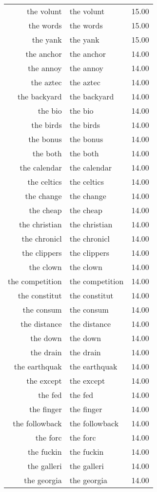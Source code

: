 \begin{table}[ht]
\begin{tabular}{rlr}
  the volunt & the volunt & 15.00 \\ 
  the words & the words & 15.00 \\ 
  the yank & the yank & 15.00 \\ 
  the anchor & the anchor & 14.00 \\ 
  the annoy & the annoy & 14.00 \\ 
  the aztec & the aztec & 14.00 \\ 
  the backyard & the backyard & 14.00 \\ 
  the bio & the bio & 14.00 \\ 
  the birds & the birds & 14.00 \\ 
  the bonus & the bonus & 14.00 \\ 
  the both & the both & 14.00 \\ 
  the calendar & the calendar & 14.00 \\ 
  the celtics & the celtics & 14.00 \\ 
  the change & the change & 14.00 \\ 
  the cheap & the cheap & 14.00 \\ 
  the christian & the christian & 14.00 \\ 
  the chronicl & the chronicl & 14.00 \\ 
  the clippers & the clippers & 14.00 \\ 
  the clown & the clown & 14.00 \\ 
  the competition & the competition & 14.00 \\ 
  the constitut & the constitut & 14.00 \\ 
  the consum & the consum & 14.00 \\ 
  the distance & the distance & 14.00 \\ 
  the down & the down & 14.00 \\ 
  the drain & the drain & 14.00 \\ 
  the earthquak & the earthquak & 14.00 \\ 
  the except & the except & 14.00 \\ 
  the fed & the fed & 14.00 \\ 
  the finger & the finger & 14.00 \\ 
  the followback & the followback & 14.00 \\ 
  the forc & the forc & 14.00 \\ 
  the fuckin & the fuckin & 14.00 \\ 
  the galleri & the galleri & 14.00 \\ 
  the georgia & the georgia & 14.00 \\ 

\end{tabular}
\end{table}
